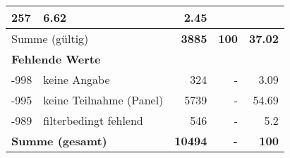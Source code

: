 \begin{longtable}{lXrrr}
       \num{257} &
       \num[round-mode=places,round-precision=2]{6,62} &
         \num[round-mode=places,round-precision=2]{2,45} \\
     \midrule
     \multicolumn{2}{l}{Summe (gültig)} &
       \textbf{\num{3885}} &
     \textbf{100} &
       \textbf{\num[round-mode=places,round-precision=2]{37,02}} \\
     \multicolumn{5}{l}{\textbf{Fehlende Werte}}\\
       -998 &
       keine Angabe &
         \num{324} &
        - &
         \num[round-mode=places,round-precision=2]{3,09} \\
       -995 &
       keine Teilnahme (Panel) &
         \num{5739} &
        - &
         \num[round-mode=places,round-precision=2]{54,69} \\
       -989 &
       filterbedingt fehlend &
         \num{546} &
        - &
         \num[round-mode=places,round-precision=2]{5,2} \\
     \midrule
     \multicolumn{2}{l}{\textbf{Summe (gesamt)}} &
          \textbf{\num{10494}} &
        \textbf{-} &
        \textbf{100} \\
     \bottomrule
     \end{longtable}
     
